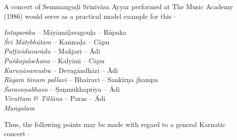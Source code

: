 A concert of Semmanguḍi Srīnivāsa Ayyar performed at The Music Academy (1986) would serve as a practical model example for this –

\textit{Intaparāka} – Māyāmāḷavagouḷa – Rūpaka\\ \textit{Śrī Mātṛbhūtam} – Kannaḍa – Cāpu\\ \textit{Paṭṭividuvarādu} – Mañjari – Ādi\\ \textit{Paṅkajalochana} – Kalyāni – Cāpu\\ \textit{Karuṇāsamudra} – Devagāndhāri – Ādi\\ \textit{Rāgam tānam pallavi} – Bhairavi – Sankīrṇa jhampa\\ \textit{Śaravaṇabhava} – Ṣaṇmukhapriya – Ādi\\ \textit{Viruttam \& Tillāna} – Paras – Ādi \\ \textit{Maṅgalam}

Thus, the following points may be made with regard to a general Karnatic concert –

